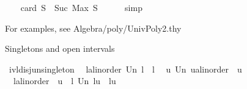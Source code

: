 \begin{isabellebody}
\ \ \isamarkupfalse%
\ {\isachardoublequoteopen}card\ S\ {\isasymle}\ Suc\ {\isacharparenleft}{\kern0pt}Max\ S{\isacharparenright}{\kern0pt}{\isachardoublequoteclose}\isanewline
\ \ \ \ \isamarkupfalse%
\ simp\isanewline
{}\isamarkupfalse%
%
\endisatagproof
{\isafoldproof}%
%
\isadelimproof
%
\endisadelimproof
%
\isadelimdocument
%
\endisadelimdocument
%
\isatagdocument
%
\isamarkuptrue%
%
\endisatagdocument
{\isafolddocument}%
%
\isadelimdocument
%
\endisadelimdocument
%
\begin{isamarkuptext}%
For examples, see Algebra/poly/UnivPoly2.thy%
\end{isamarkuptext}\isamarkuptrue%
%
\isadelimdocument
%
\endisadelimdocument
%
\isatagdocument
%
\isamarkuptrue%
%
\endisatagdocument
{\isafolddocument}%
%
\isadelimdocument
%
\endisadelimdocument
%
\begin{isamarkuptext}%
Singletons and open intervals%
\end{isamarkuptext}\isamarkuptrue%
\isamarkupfalse%
\ ivl{\isacharunderscore}{\kern0pt}disj{\isacharunderscore}{\kern0pt}un{\isacharunderscore}{\kern0pt}singleton{\isacharcolon}{\kern0pt}\isanewline
\ \ {\isachardoublequoteopen}{\isacharbraceleft}{\kern0pt}l{\isacharcolon}{\kern0pt}{\isacharcolon}{\kern0pt}{\isacharprime}{\kern0pt}a{\isacharcolon}{\kern0pt}{\isacharcolon}{\kern0pt}linorder{\isacharbraceright}{\kern0pt}\ Un\ {\isacharbraceleft}{\kern0pt}l{\isacharless}{\kern0pt}{\isachardot}{\kern0pt}{\isachardot}{\kern0pt}{\isacharbraceright}{\kern0pt}\ {\isacharequal}{\kern0pt}\ {\isacharbraceleft}{\kern0pt}l{\isachardot}{\kern0pt}{\isachardot}{\kern0pt}{\isacharbraceright}{\kern0pt}{\isachardoublequoteclose}\isanewline
\ \ {\isachardoublequoteopen}{\isacharbraceleft}{\kern0pt}{\isachardot}{\kern0pt}{\isachardot}{\kern0pt}{\isacharless}{\kern0pt}u{\isacharbraceright}{\kern0pt}\ Un\ {\isacharbraceleft}{\kern0pt}u{\isacharcolon}{\kern0pt}{\isacharcolon}{\kern0pt}{\isacharprime}{\kern0pt}a{\isacharcolon}{\kern0pt}{\isacharcolon}{\kern0pt}linorder{\isacharbraceright}{\kern0pt}\ {\isacharequal}{\kern0pt}\ {\isacharbraceleft}{\kern0pt}{\isachardot}{\kern0pt}{\isachardot}{\kern0pt}u{\isacharbraceright}{\kern0pt}{\isachardoublequoteclose}\isanewline
\ \ {\isachardoublequoteopen}{\isacharparenleft}{\kern0pt}l{\isacharcolon}{\kern0pt}{\isacharcolon}{\kern0pt}{\isacharprime}{\kern0pt}a{\isacharcolon}{\kern0pt}{\isacharcolon}{\kern0pt}linorder{\isacharparenright}{\kern0pt}\ {\isacharless}{\kern0pt}\ u\ {\isacharequal}{\kern0pt}{\isacharequal}{\kern0pt}{\isachargreater}{\kern0pt}\ {\isacharbraceleft}{\kern0pt}l{\isacharbraceright}{\kern0pt}\ Un\ {\isacharbraceleft}{\kern0pt}l{\isacharless}{\kern0pt}{\isachardot}{\kern0pt}{\isachardot}{\kern0pt}{\isacharless}{\kern0pt}u{\isacharbraceright}{\kern0pt}\ {\isacharequal}{\kern0pt}\ {\isacharbraceleft}{\kern0pt}l{\isachardot}{\kern0pt}{\isachardot}{\kern0pt}{\isacharless}{\kern0pt}u{\isacharbraceright}{\kern0pt}{\isachardoublequoteclose}\isanewline

\end{isabellebody}

